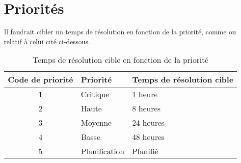 \section{Priorités}
Il faudrait cibler un temps de résolution en fonction de la priorité,
comme ou relatif à celui cité ci-dessous.

\begin{table}[H]
    \centering
    \begin{tabular}{|c|l|l|}
         \hline
         Code de priorité & Priorité & Temps de résolution cible  \\ \hline
         1 & Critique & 1 heure \\ \hline
         2 & Haute & 8 heures \\ \hline
         3 & Moyenne & 24 heures \\ \hline
         4 & Basse & 48 heures \\ \hline
         5 & Planification & Planifié \\ \hline
    \end{tabular}
    \caption{Temps de résolution cible en fonction de la priorité}
\end{table}

